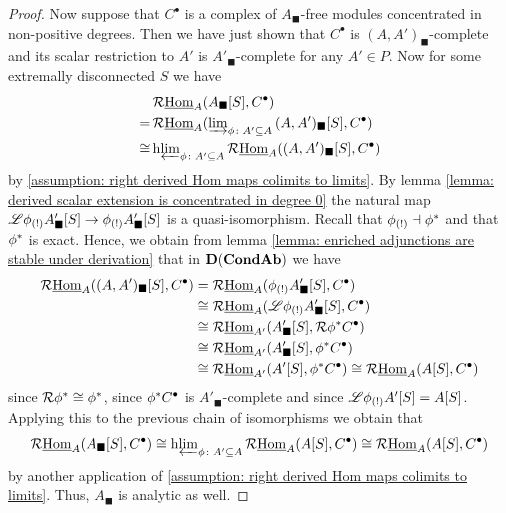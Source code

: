 \begin{proof}
	Now suppose that $C^\bullet$ is a complex of $A_\blacksquare$-free modules concentrated in non-positive degrees. Then we have just shown that $C^\bullet$ is $(A, A')_\blacksquare$-complete and its scalar restriction to $A'$ is $A'_\blacksquare$-complete for any $A'\in P$. Now for some extremally disconnected $S$ we have
	\begin{align*}
		&\mathcal{R}{\underline{\operatorname{Hom}}}_A({A_\blacksquare[S]}, C^\bullet) \\
		=\,&\mathcal{R}{\underline{\operatorname{Hom}}}_A(\varinjlim\nolimits_{\phi\colon A'\subseteq A} {(A, A')_\blacksquare[S]}, C^\bullet)\\
		\cong\,&\mathrm{h}\!\varprojlim\nolimits\nolimits_{\phi\colon A'\subseteq A} \mathcal{R}{\underline{\operatorname{Hom}}}_A({(A, A')_\blacksquare[S]}, C^\bullet)
	\end{align*}
	by \assumptionPreWord \ref{assumption: right derived Hom maps colimits to limits}. By lemma \ref{lemma: derived scalar extension is concentrated in degree 0} the natural map $\mathscr{L}{\phi_{(!)}}{A'_\blacksquare[S]}\to {\phi_{(!)}}{A'_\blacksquare[S]}$ is a quasi-isomorphism. Recall that ${\phi_{(!)}}\dashv {\phi^\ast}$ and that ${\phi^\ast}$ is exact. Hence, we obtain from lemma \ref{lemma: enriched adjunctions are stable under derivation} that in ${{\mathbf{D}}({{{\mathbf{Cond}}}{{\mathbf{Ab}}}})}$ we have
	\begin{align*}
		\mathcal{R}{\underline{\operatorname{Hom}}}_A({(A, A')_\blacksquare[S]}, C^\bullet)&= \mathcal{R}{\underline{\operatorname{Hom}}}_A({\phi_{(!)}}{A'_\blacksquare[S]}, C^\bullet)\\
		& \cong \mathcal{R}{\underline{\operatorname{Hom}}}_A(\mathscr{L}{\phi_{(!)}}{A'_\blacksquare[S]}, C^\bullet)\\
		&\cong \mathcal{R}{\underline{\operatorname{Hom}}}_{A'}({A'_\blacksquare[S]}, \mathcal{R}{\phi^\ast}C^\bullet)\\
		&\cong \mathcal{R}{\underline{\operatorname{Hom}}}_{A'}({A'_\blacksquare[S]}, {\phi^\ast}C^\bullet)\\
		&\cong \mathcal{R}{\underline{\operatorname{Hom}}}_{A'}({A'[S]}, {\phi^\ast}C^\bullet) \cong \mathcal{R}{\underline{\operatorname{Hom}}}_A({A[S]}, C^\bullet)
	\end{align*}
	since $\mathcal{R}{\phi^\ast} \cong {\phi^\ast}$, since ${\phi^\ast}C^\bullet$ is $A'_\blacksquare$-complete and since $\mathscr{L}{\phi_{(!)}}{A'[S]} = {A[S]}$. Applying this to the previous chain of isomorphisms we obtain that
	$$\mathcal{R}{\underline{\operatorname{Hom}}}_A({A_\blacksquare[S]}, C^\bullet) \cong \mathrm{h}\!\varprojlim\nolimits\nolimits_{\phi\colon A'\subseteq A} \mathcal{R}{\underline{\operatorname{Hom}}}_A({A[S]}, C^\bullet) \cong \mathcal{R}{\underline{\operatorname{Hom}}}_A({A[S]}, C^\bullet)$$
	by another application of \assumptionPreWord \ref{assumption: right derived Hom maps colimits to limits}. Thus, $A_\blacksquare$ is analytic as well.
\end{proof}

